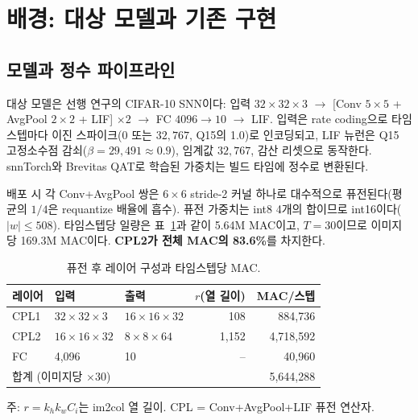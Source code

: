 \section{배경: 대상 모델과 기존 구현}\label{sec:background}

\subsection{모델과 정수 파이프라인}

대상 모델은 선행 연구\cite{cha2026fusion}의 CIFAR-10 SNN이다:
입력 $32{\times}32{\times}3$ $\rightarrow$ [Conv $5{\times}5$ +
AvgPool $2{\times}2$ + LIF] $\times 2$ $\rightarrow$ FC
$4096{\rightarrow}10$ $\rightarrow$ LIF. 입력은 rate coding으로
타임스텝마다 이진 스파이크($0$ 또는 $32{,}767$, Q15의 1.0)로
인코딩되고, LIF 뉴런은 Q15 고정소수점 감쇠($\beta{=}29{,}491
\approx 0.9$), 임계값 $32{,}767$, 감산 리셋으로 동작한다.
snnTorch\cite{eshraghian2023training}와
Brevitas\cite{brevitas2023} QAT로 학습된 가중치는 빌드 타임에 정수로
변환된다\cite{jacob2018quantization}.

배포 시 각 Conv+AvgPool 쌍은 $6{\times}6$ stride-2 커널 하나로
대수적으로 퓨전된다(평균의 $1/4$은 requantize 배율에 흡수). 퓨전
가중치는 int8 4개의 합이므로 int16이다($|w|\le 508$). 타임스텝당
일량은 표~\ref{tab:model}과 같이 5.64M MAC이고, $T{=}30$이므로
이미지당 169.3M MAC이다. \textbf{CPL2가 전체 MAC의 83.6\%}를
차지한다.

\begin{table}[htbp]
\centering
\caption{퓨전 후 레이어 구성과 타임스텝당 MAC.}
\label{tab:model}
\footnotesize
\setlength{\tabcolsep}{3.5pt}
\begin{tabular}{l l l r r}
\hline
레이어 & 입력 & 출력 & $r$(열 길이) & MAC/스텝 \\
\hline
CPL1 & $32{\times}32{\times}3$ & $16{\times}16{\times}32$ & 108 & 884,736 \\
CPL2 & $16{\times}16{\times}32$ & $8{\times}8{\times}64$ & 1,152 & 4,718,592 \\
FC & 4,096 & 10 & -- & 40,960 \\
\hline
\multicolumn{4}{l}{합계 (이미지당 $\times 30$)} & 5,644,288 \\
\hline
\end{tabular}
\begin{flushleft}
\footnotesize 주: $r = k_h k_w C_i$는 im2col 열 길이. CPL =
Conv+AvgPool+LIF 퓨전 연산자.
\end{flushleft}
\end{table}

